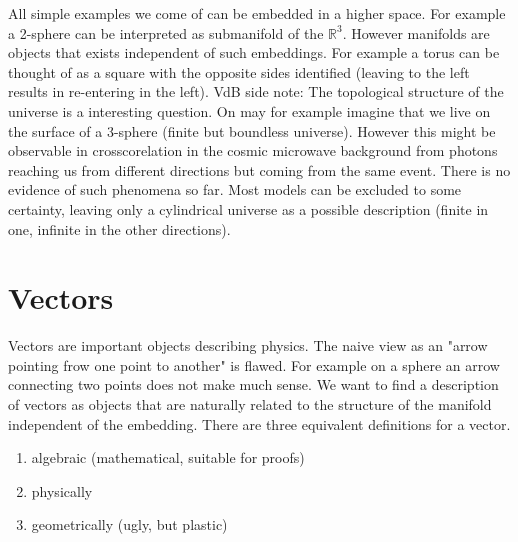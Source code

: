 \documentclass[
    a4paper,                                               %
    oneside,                                               %
    12pt,                                                  %
    headsepline,                                           %
    xcolor=dvipsnames
    ]{scrreprt}
\theoremstyle{definition}
\theoremstyle{remark}
\begin{document}
	    All simple examples we come of can be embedded in a higher space. For example a 2-sphere can be interpreted as submanifold of the $\mathbb{R}^3$. However manifolds are objects that exists independent of such embeddings. For example a torus can be thought of as a square with the opposite sides identified (leaving to the left results in re-entering in the left).
	    VdB side note: The topological structure of the universe is a interesting question.  On may for example imagine that we live on the surface of a 3-sphere (finite but boundless universe). However this might be observable in crosscorelation in the cosmic microwave background from photons reaching us from different directions but coming from the same event. There is no evidence of such phenomena so far. Most models can be excluded to some certainty, leaving only a cylindrical universe as a possible description (finite in one, infinite in the other directions).
	     \section{Vectors}
	     Vectors are important objects describing physics. The naive view as an "arrow pointing frow one point to another" is flawed. For example on a sphere an arrow connecting two points does not make much sense.
	     We want to find a description of vectors as objects that are naturally related to the structure of the manifold independent of the embedding.
	     There are three equivalent definitions for a vector.
	     \begin{enumerate}
	     	\item algebraic (mathematical, suitable for proofs)
	     	\item physically
	     	\item geometrically (ugly, but plastic)
	     \end{enumerate}  
\end{document}
